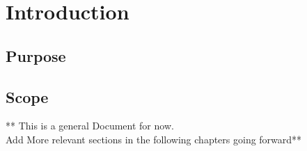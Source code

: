 \chapter{Introduction}
\label{ch:Introduction}


\section{Purpose}

\section{Scope}

** This is a general Document for now.\\
Add More relevant sections in the following chapters going forward**




